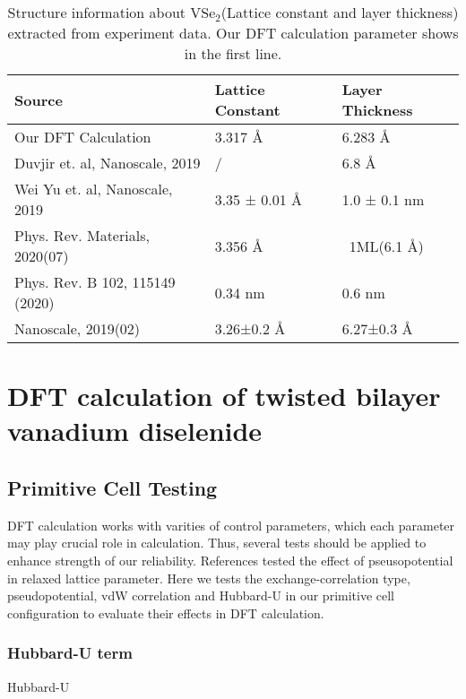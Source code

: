 \begin{table}
	\caption[Structure information about VSe$_2$ extracted from experiment data]{
		Structure information about VSe$_2$(Lattice constant and layer thickness) extracted from experiment data. Our DFT calculation parameter shows in the first line.
	}
	\begin{tabular}{lll}
	\toprule
	Source                          & Lattice Constant & Layer Thickness \\
	\midrule
	Our DFT Calculation             & 3.317 Å          & 6.283 Å         \\
	Duvjir et. al, Nanoscale, 2019  & /                & 6.8 Å           \\
	Wei Yu et. al, Nanoscale, 2019  & 3.35 ± 0.01 Å    & 1.0 ± 0.1 nm    \\
	Phys. Rev. Materials, 2020(07)  & 3.356 Å          & ~1ML(6.1 Å)     \\
	Phys. Rev. B 102, 115149 (2020) & 0.34 nm          & 0.6 nm          \\
	Nanoscale, 2019(02)             & 3.26±0.2 Å       & 6.27±0.3 Å  	 \\
	\bottomrule
	\end{tabular}
\end{table}

\chapter{DFT calculation of twisted bilayer vanadium diselenide}

\section{Primitive Cell Testing}

DFT calculation works with varities of control parameters, which each parameter may play crucial role in calculation. Thus, several tests should be applied to enhance strength of our reliability. References  tested the effect of pseusopotential in relaxed lattice parameter. Here we tests the exchange-correlation type, pseudopotential, vdW correlation and Hubbard-U in our primitive cell configuration to evaluate their effects in DFT calculation.

\subsection{Hubbard-U term}
Hubbard-U
